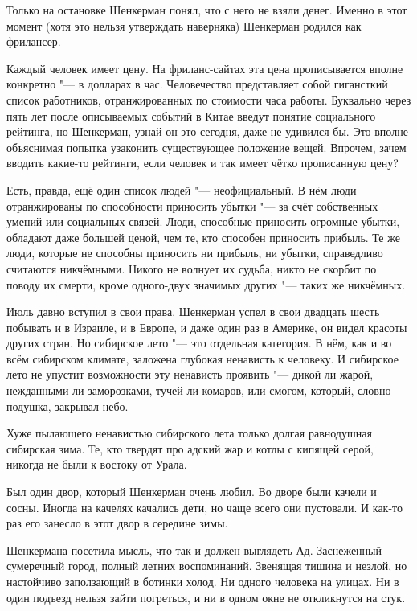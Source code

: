 Только на остановке Шенкерман понял, что с него не взяли денег.
Именно в этот момент (хотя это нельзя утверждать наверняка) Шенкерман родился как фрилансер.

Каждый человек имеет цену.
На фриланс-сайтах эта цена прописывается вполне конкретно "--- в долларах в час.
Человечество представляет собой гигансткий список работников, отранжированных по стоимости часа работы.
Буквально через пять лет после описываемых событий в Китае введут понятие социального рейтинга, но Шенкерман, узнай он это сегодня, даже не удивился бы.
Это вполне объяснимая попытка узаконить существующее положение вещей.
Впрочем, зачем вводить какие-то рейтинги, если человек и так имеет чётко прописанную цену?

Есть, правда, ещё один список людей "--- неофициальный.
В нём люди отранжированы по способности приносить убытки "--- за счёт собственных умений или социальных связей.
Люди, способные приносить огромные убытки, обладают даже большей ценой, чем те, кто способен приносить прибыль.
Те же люди, которые не способны приносить ни прибыль, ни убытки, справедливо считаются никчёмными.
Никого не волнует их судьба, никто не скорбит по поводу их смерти, кроме одного-двух значимых других "--- таких же никчёмных.

\asterism

Июль давно вступил в свои права.
Шенкерман успел в свои двадцать шесть побывать и в Израиле, и в Европе, и даже один раз в Америке, он видел красоты других стран.
Но сибирское лето "--- это отдельная категория.
В нём, как и во всём сибирском климате, заложена глубокая ненависть к человеку.
И сибирское лето не упустит возможности эту ненависть проявить "--- дикой ли жарой, нежданными ли заморозками, тучей ли комаров, или смогом, который, словно подушка, закрывал небо.

Хуже пылающего ненавистью сибирского лета только долгая равнодушная сибирская зима.
Те, кто твердят про адский жар и котлы с кипящей серой, никогда не были к востоку от Урала.

Был один двор, который Шенкерман очень любил.
Во дворе были качели и сосны.
Иногда на качелях качались дети, но чаще всего они пустовали.
И как-то раз его занесло в этот двор в середине зимы.

Шенкермана посетила мысль, что так и должен выглядеть Ад.
Заснеженный сумеречный город, полный летних воспоминаний.
Звенящая тишина и незлой, но настойчиво заползающий в ботинки холод.
Ни одного человека на улицах.
Ни в один подъезд нельзя зайти погреться, и ни в одном окне не откликнутся на стук.

